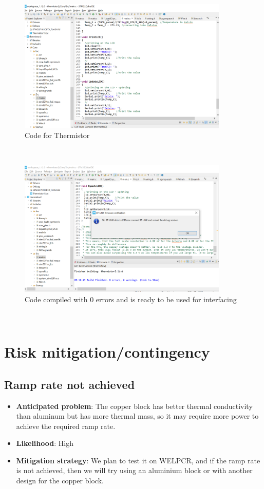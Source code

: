 \documentclass{article}
\begin{document}
\begin{figure}[h]
    \centering
    \includegraphics[width=10cm]{Code3.png}
    \caption{Code for Thermistor}
    \label{fig:galaxy}
\end{figure}\\

\begin{figure}[h]
    \centering
    \includegraphics[width=10cm]{Code4.png}
    \caption{Code compiled with 0 errors and is ready to be used for interfacing}
    \label{fig:galaxy}
\end{figure}\\

\section{Risk mitigation/contingency}
\subsection{Ramp rate not achieved}
\begin{itemize}
    \item \textbf{Anticipated problem}: The copper block has better thermal conductivity than aluminum but has more thermal mass, so it may require more power to achieve the required ramp rate.
\item \textbf{Likelihood}: High
\item \textbf{Mitigation strategy}: We plan to test it on WELPCR, and if the ramp rate is not achieved, then we will try using an aluminium block or with another design for the copper block.
\end{itemize}
\end{document}
